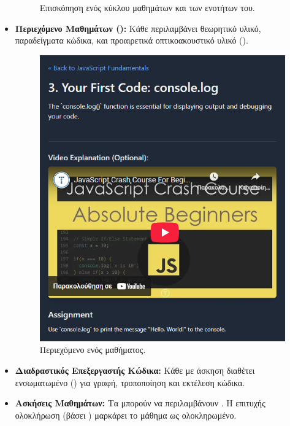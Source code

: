 \begin{itemize}[leftmargin=*, noitemsep]
\begin{figure}[h!]
          \caption{Επισκόπηση ενός κύκλου μαθημάτων και των ενοτήτων του.}
          \label{fig:course_show_placeholder}
        \end{figure}
    \item \textbf{Περιεχόμενο Μαθημάτων ():} Κάθε  περιλαμβάνει θεωρητικό υλικό, παραδείγματα κώδικα, και προαιρετικά οπτικοακουστικό υλικό ().
        \begin{figure}[h!]
          \centering
          \includegraphics[scale=0.4]{images/lesson_content.png}
          \caption{Περιεχόμενο ενός μαθήματος.}
          \label{fig:lesson_content_placeholder}
        \end{figure}
    \item \textbf{Διαδραστικός Επεξεργαστής Κώδικα:} Κάθε  με άσκηση διαθέτει ενσωματωμένο  () για γραφή, τροποποίηση και  εκτέλεση κώδικα.
    \item \textbf{Ασκήσεις Μαθημάτων:} Τα  μπορούν να περιλαμβάνουν . Η επιτυχής ολοκλήρωση (βάσει ) μαρκάρει το μάθημα ως ολοκληρωμένο.

\end{itemize}
